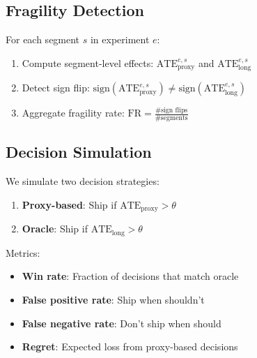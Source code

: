 \documentclass[11pt,twocolumn]{article}
\begin{document}
\subsection{Fragility Detection}

For each segment $s$ in experiment $e$:

\begin{enumerate}
    \item Compute segment-level effects: $\text{ATE}_{\text{proxy}}^{e,s}$ and $\text{ATE}_{\text{long}}^{e,s}$
    \item Detect sign flip: $\text{sign}(\text{ATE}_{\text{proxy}}^{e,s}) \neq \text{sign}(\text{ATE}_{\text{long}}^{e,s})$
    \item Aggregate fragility rate: $\text{FR} = \frac{\text{\# sign flips}}{\text{\# segments}}$
\end{enumerate}

\subsection{Decision Simulation}

We simulate two decision strategies:

\begin{enumerate}
    \item \textbf{Proxy-based}: Ship if $\text{ATE}_{\text{proxy}} > \theta$
    \item \textbf{Oracle}: Ship if $\text{ATE}_{\text{long}} > \theta$
\end{enumerate}

Metrics:
\begin{itemize}
    \item \textbf{Win rate}: Fraction of decisions that match oracle
    \item \textbf{False positive rate}: Ship when shouldn't
    \item \textbf{False negative rate}: Don't ship when should
    \item \textbf{Regret}: Expected loss from proxy-based decisions
\end{itemize}
\end{document}
